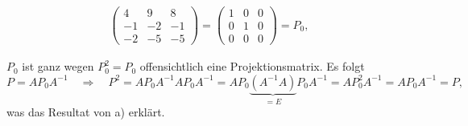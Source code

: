 \begin{loesung}
\begin{teilaufgaben}
\begin{align*}
\begin{pmatrix}
 4& 9& 8\\
-1&-2&-1\\
-2&-5&-5
\end{pmatrix}
=
\begin{pmatrix}
1&0&0\\
0&1&0\\
0&0&0
\end{pmatrix}
=P_0,
\end{align*}
\item
$P_0$ ist ganz wegen
$P_0^2=P_0$
offensichtlich eine Projektionsmatrix.
Es folgt
\[
P=AP_0A^{-1}
\quad\Rightarrow\quad
P^2
=
AP_0A^{-1} AP_0A^{-1}
=
AP_0\underbrace{(A^{-1} A)}_{\displaystyle =E}P_0A^{-1}
=
AP_0^2A^{-1}
=
AP_0A^{-1}
=
P,
\]
was das Resultat von a) erklärt.
\qedhere
\end{teilaufgaben}
\end{loesung}

